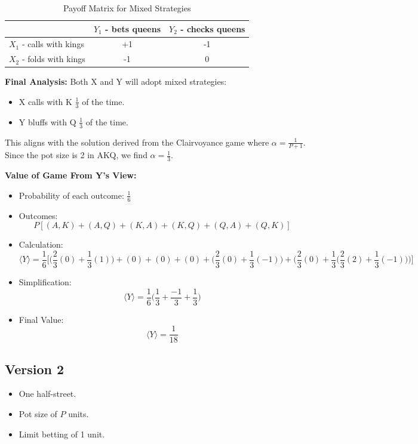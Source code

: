 \documentclass[12pt]{article}
\begin{document}
\begin{table}[h]
    \centering
    \begin{tabular}{|l|c|c|}
        \hline
        & \(Y_1\) - bets queens & \(Y_2\) - checks queens \\ \hline
        \(X_1\) - calls with kings & +1 & -1 \\ \hline
        \(X_2\) - folds with kings & -1 & 0 \\ \hline
    \end{tabular}
    \caption{Payoff Matrix for Mixed Strategies}
    \label{tab:payoff_matrix}
\end{table}

\noindent\textbf{Final Analysis:}  
Both X and Y will adopt mixed strategies:
\begin{itemize}
    \item X calls with K $\frac{1}{3}$ of the time.
    \item Y bluffs with Q $\frac{1}{3}$ of the time.
\end{itemize}

\noindent This aligns with the solution derived from the Clairvoyance game where \(\alpha = \frac{1}{P+1}\). Since the pot size is 2 in AKQ, we find \(\alpha = \frac{1}{3}\).

\textbf{Value of Game From Y's View:}
\begin{itemize}
    \item Probability of each outcome: \(\frac{1}{6}\)
    \item Outcomes: 
    \[
    P[(A,K) + (A,Q) + (K,A) + (K,Q) + (Q,A) + (Q,K)]
    \]
    \item Calculation:
    \[
    \langle Y \rangle = \frac{1}{6} \bigg[
        \bigg( \frac{2}{3}(0) + \frac{1}{3}(1) \bigg) + 
        (0) + (0) + (0) + 
        \bigg( \frac{2}{3}(0) + \frac{1}{3}(-1) \bigg) + 
        \bigg( \frac{2}{3}(0) + \frac{1}{3} \bigg( \frac{2}{3}(2) + \frac{1}{3}(-1) \bigg) \bigg)
    \bigg]
    \]
    \item Simplification:
    \[
    \langle Y \rangle = \frac{1}{6} \bigg( \frac{1}{3} + \frac{-1}{3} + \frac{1}{3} \bigg)
    \]
    \item Final Value:
    \[
    \langle Y \rangle = \frac{1}{18}
    \]
\end{itemize}

\subsection*{Version 2}
\begin{itemize}
    \item One half-street.
    \item Pot size of \( P \) units.
    \item Limit betting of 1 unit.
\end{itemize}
\end{document}

